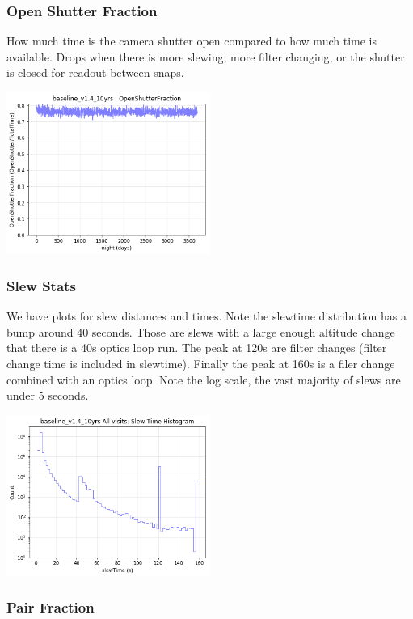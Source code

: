 {\subsubsection{Open Shutter Fraction}

How much time is the camera shutter open compared to how much time is available. Drops when there is more slewing, more filter changing, or the shutter is closed for readout between snaps.

\includegraphics[width=0.5\textwidth]{metric_summary/glance/thumb.baseline_v1_4_10yrs_OpenShutterFraction_ONED_BinnedData.png}

\subsubsection{Slew Stats}

We have plots for slew distances and times. Note the slewtime distribution has a bump around 40 seconds. Those are slews with a large enough altitude change that there is a 40s optics loop run. The peak at 120s are filter changes (filter change time is included in slewtime). Finally the peak at 160s is a filer change combined with an optics loop. Note the log scale, the vast majority of slews are under 5 seconds.

\includegraphics[width=0.5\textwidth]{metric_summary/glance/thumb.baseline_v1_4_10yrs_Slew_Time_Histogram_All_visits_ONED_BinnedData.png}

\subsubsection{Pair Fraction}

}
